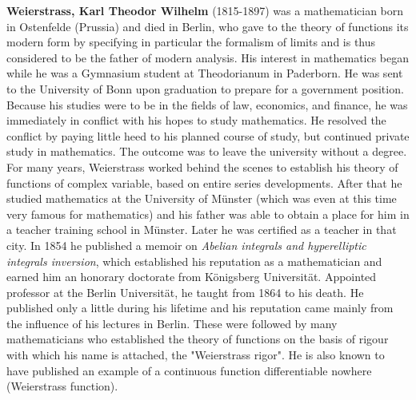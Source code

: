 \textbf{Weierstrass, Karl Theodor Wilhelm }(1815-1897) was a mathematician born in Ostenfelde (Prussia) and died in Berlin, who gave to the theory of functions its modern form by specifying in particular the formalism of limits and is thus considered to be the father of modern analysis. His interest in mathematics began while he was a Gymnasium student at Theodorianum in Paderborn. He was sent to the University of Bonn upon graduation to prepare for a government position. Because his studies were to be in the fields of law, economics, and finance, he was immediately in conflict with his hopes to study mathematics. He resolved the conflict by paying little heed to his planned course of study, but continued private study in mathematics. The outcome was to leave the university without a degree. For many years, Weierstrass worked behind the scenes to establish his theory of functions of complex variable, based on entire series developments. After that he studied mathematics at the University of Münster (which was even at this time very famous for mathematics) and his father was able to obtain a place for him in a teacher training school in Münster. Later he was certified as a teacher in that city. In 1854 he published a memoir on \textit{Abelian integrals and hyperelliptic integrals inversion}, which established his reputation as a mathematician and earned him an honorary doctorate from Königsberg Universität. Appointed professor at the Berlin Universität, he taught from 1864 to his death. He published only a little during his lifetime and his reputation came mainly from the influence of his lectures in Berlin. These were followed by many mathematicians who established the theory of functions on the basis of rigour with which his name is attached, the "Weierstrass rigor". He is also known to have published an example of a continuous function differentiable nowhere (Weierstrass function).


